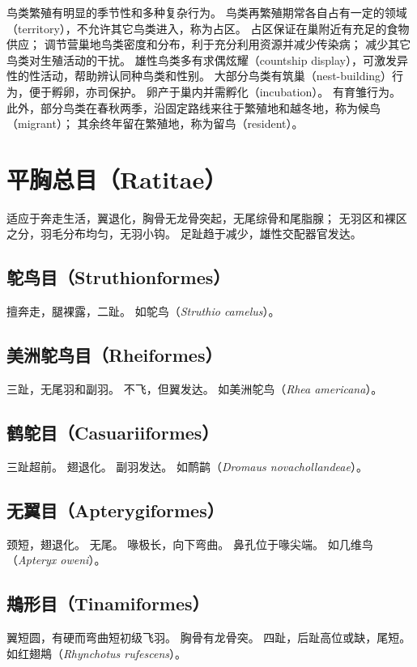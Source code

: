\documentclass[11pt]{article}
\begin{document}
\newline

鸟类繁殖有明显的季节性和多种复杂行为。
鸟类再繁殖期常各自占有一定的领域（territory），不允许其它鸟类进入，称为占区。
占区保证在巢附近有充足的食物供应；
调节营巢地鸟类密度和分布，利于充分利用资源并减少传染病；
减少其它鸟类对生殖活动的干扰。
雄性鸟类多有求偶炫耀（countship display），可激发异性的性活动，帮助辨认同种鸟类和性别。
大部分鸟类有筑巢（nest-building）行为，便于孵卵，亦司保护。
卵产于巢内并需孵化（incubation）。
有育雏行为。
此外，部分鸟类在春秋两季，沿固定路线来往于繁殖地和越冬地，称为候鸟（migrant）；
其余终年留在繁殖地，称为留鸟（resident）。

\section{平胸总目（Ratitae）}
适应于奔走生活，翼退化，胸骨无龙骨突起，无尾综骨和尾脂腺；
无羽区和裸区之分，羽毛分布均匀，无羽小钩。
足趾趋于减少，雄性交配器官发达。

\subsection{鸵鸟目（Struthionformes）}
擅奔走，腿裸露，二趾。
如鸵鸟（\textit{Struthio camelus}）。

\subsection{美洲鸵鸟目（Rheiformes）}
三趾，无尾羽和副羽。
不飞，但翼发达。
如美洲鸵鸟（\textit{Rhea americana}）。

\subsection{鹤鸵目（Casuariiformes）}
三趾超前。
翅退化。
副羽发达。
如鸸鹋（\textit{Dromaus novachollandeae}）。

\subsection{无翼目（Apterygiformes）}
颈短，翅退化。
无尾。
喙极长，向下弯曲。
鼻孔位于喙尖端。
如几维鸟（\textit{Apteryx oweni}）。

\subsection{䳍形目（Tinamiformes）}
翼短圆，有硬而弯曲短初级飞羽。
胸骨有龙骨突。
四趾，后趾高位或缺，尾短。
如红翅䳍（\textit{Rhynchotus rufescens}）。
\end{document}
